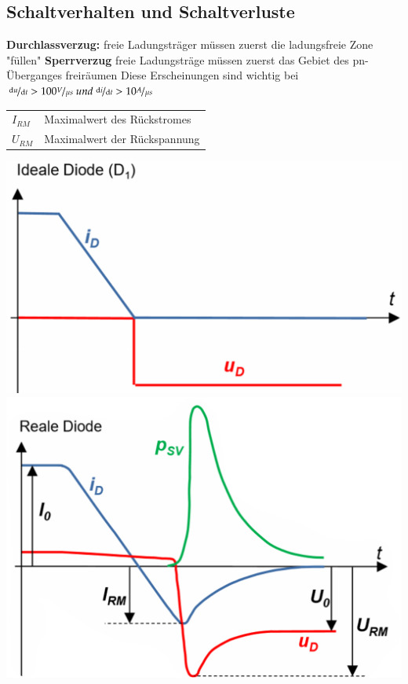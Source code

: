 \subsection{Schaltverhalten und Schaltverluste}
    \begin{minipage}{0.7\linewidth}
        \raggedright
        \textbf{Durchlassverzug:}\newline
        freie Ladungsträger müssen zuerst die ladungsfreie Zone "füllen"\newline\newline
        \textbf{Sperrverzug}\newline
        freie Ladungsträge müssen zuerst das Gebiet des pn-Überganges freiräumen\newline\newline
        Diese Erscheinungen sind wichtig bei  $\nicefrac{\mathop{}\!\mathrm{d} u}{\mathop{}\!\mathrm{d} t} > 100 \nicefrac{V}{\mu s} \; und \; \nicefrac{\mathop{}\!\mathrm{d} i}{\mathop{}\!\mathrm{d} t} > 10 \nicefrac{A}{\mu s} $
        \begin{tabular}{ll}
            $ I_{RM} $&Maximalwert des Rückstromes\\
            $ U_{RM} $&Maximalwert der Rückspannung\\
        \end{tabular}
    \end{minipage}   
    \begin{minipage}{0.3\linewidth}
        \vspace{-0.8cm}
        \raggedleft
            \includegraphics[width=\linewidth]{images/idealeDiodeSS}           
            \includegraphics[width=\linewidth]{images/realeDiodeSS}
    \end{minipage}
\clearpage